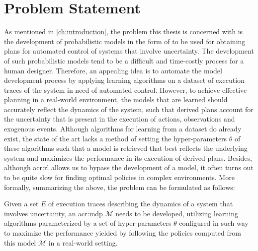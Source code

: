 \section{Problem Statement}
\label{sec:problem-statement}

As mentioned in \autoref{ch:introduction}, the problem this thesis is concerned with is the development of probabilistic models in the form of  to be used for obtaining plans for automated control of systems that involve uncertainty.
The development of such probabilistic models tend to be a difficult and time-costly process for a human designer.
Therefore, an appealing idea is to automate the model development process by applying learning algorithms on a dataset of execution traces of the system in need of automated control.
However, to achieve effective planning in a real-world environment, the models that are learned should accurately reflect the dynamics of the system, such that derived plans account for the uncertainty that is present in the execution of actions, observations and exogenous events.
Although algorithms for learning  from a dataset do already exist, the state of the art lacks a method of setting the hyper-parameters $\theta$ of these algorithms such that a model is retrieved that best reflects the underlying system and maximizes the performance in its execution of derived plans.
Besides, although \acrfull{acr:rl} allows us to bypass the development of a model, it often turns out to be quite slow for finding optimal policies in complex environments.
More formally, summarizing the above, the problem can be formulated as follows:

\begin{problem}
	Given a set $E$ of execution traces describing the dynamics of a system that involves uncertainty, an \acrshort{acr:mdp} $\mathcal{M}$ needs to be developed, utilizing learning algorithms parameterized by a set of hyper-parameters $\theta$ configured in such way to maximize the performance yielded by following the policies computed from this model $\mathcal{M}$ in a real-world setting.
\end{problem}

